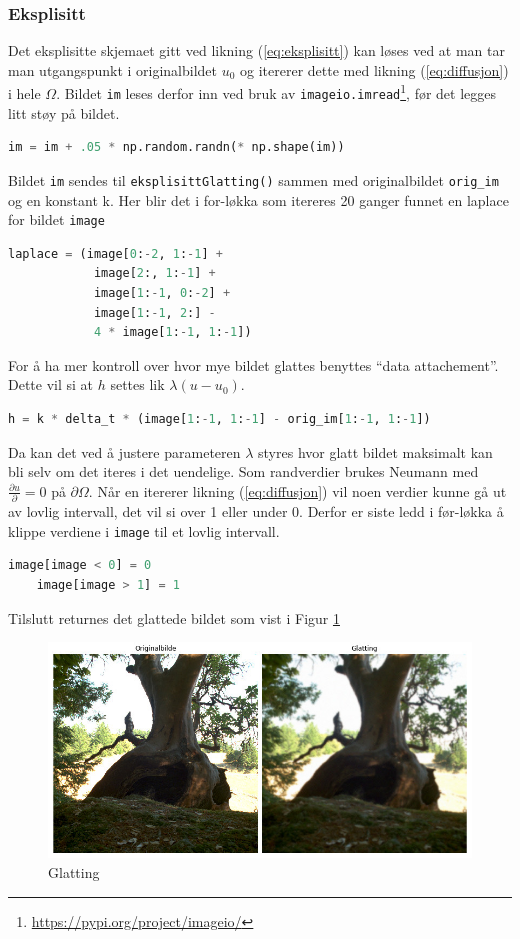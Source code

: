 \subsubsection{Eksplisitt}
Det eksplisitte skjemaet gitt ved likning (\ref{eq:eksplisitt}) kan løses ved at man tar man utgangspunkt i originalbildet $u_0$ og itererer dette med likning (\ref{eq:diffusjon}) i hele $\Omega$. Bildet \texttt{im} leses derfor inn ved bruk av \texttt{imageio.imread}\footnote{\url{https://pypi.org/project/imageio/}}, før det legges litt støy på bildet.
\begin{lstlisting}[language=Python]
    im = im + .05 * np.random.randn(* np.shape(im))
\end{lstlisting}
Bildet \texttt{im} sendes til \texttt{eksplisittGlatting()} sammen med originalbildet  \texttt{orig\_im} og en konstant k. Her blir det i for-løkka som itereres 20 ganger funnet en laplace for bildet \texttt{image}
\begin{lstlisting}[language=Python]
    laplace = (image[0:-2, 1:-1] + 
            image[2:, 1:-1] +
            image[1:-1, 0:-2] +
            image[1:-1, 2:] -
            4 * image[1:-1, 1:-1])
\end{lstlisting}
For å ha mer kontroll over hvor mye bildet glattes benyttes ``data attachement''. Dette vil si at $h$ settes lik $\lambda(u-u_0)$. 
\begin{lstlisting}[language=Python]
    h = k * delta_t * (image[1:-1, 1:-1] - orig_im[1:-1, 1:-1])
\end{lstlisting}
Da kan det ved å justere parameteren $\lambda$ styres hvor glatt bildet maksimalt kan bli selv om det iteres i det uendelige. Som randverdier brukes Neumann med $\frac{\partial u} {\partial} = 0$ på $\partial \Omega$. Når en itererer likning (\ref{eq:diffusjon}) vil noen verdier kunne gå ut av lovlig intervall, det vil si over 1 eller under 0. Derfor er siste ledd i før-løkka å klippe verdiene i \texttt{image} til et lovlig intervall.
\begin{lstlisting}[language=Python]
    image[image < 0] = 0
    image[image > 1] = 1
\end{lstlisting}
Tilslutt returnes det glattede bildet som vist i Figur \ref{fig:glattingEks}
\begin{figure}
\begin{center}
    \includegraphics[width=1\columnwidth]{bilder/glattingEksplisitt.jpg}
    \caption{Glatting~ \label{fig:glattingEks}}
\end{center}
\end{figure}

